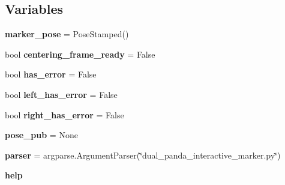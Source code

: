 \subsection*{Variables}
\begin{DoxyCompactItemize}
\item 
\mbox{\label{namespacedual__arm__interactive__marker_ae1dc1823850439ceb0256e842fe101af}} 
{\bfseries marker\+\_\+pose} = Pose\+Stamped()
\item 
\mbox{\label{namespacedual__arm__interactive__marker_ad58577105bcd5d623c1cc9eb2e3c72ac}} 
bool {\bfseries centering\+\_\+frame\+\_\+ready} = False
\item 
\mbox{\label{namespacedual__arm__interactive__marker_a91bdb7838358a5dc012220bdda750474}} 
bool {\bfseries has\+\_\+error} = False
\item 
\mbox{\label{namespacedual__arm__interactive__marker_aa91188fad3c0fe29eb194de0749d679b}} 
bool {\bfseries left\+\_\+has\+\_\+error} = False
\item 
\mbox{\label{namespacedual__arm__interactive__marker_a54051039c162d3e6850c7975a2798c43}} 
bool {\bfseries right\+\_\+has\+\_\+error} = False
\item 
\mbox{\label{namespacedual__arm__interactive__marker_a1cf87b0dd85b2d2e96272ec48965cb5c}} 
{\bfseries pose\+\_\+pub} = None
\item 
\mbox{\label{namespacedual__arm__interactive__marker_a5cac52437015f562072ed9f81a317214}} 
{\bfseries parser} = argparse.\+Argument\+Parser(\char`\"{}dual\+\_\+panda\+\_\+interactive\+\_\+marker.\+py\char`\"{})
\item 
\mbox{\label{namespacedual__arm__interactive__marker_a551f6886fb11c8c7022dabbaff35194e}} 
{\bfseries help}
\item 
\mbox{\label{namespacedual__arm__interactive__marker_abafb62c73e0ce1d3e29223d4b249b2cd}} 

\end{DoxyCompactItemize}
